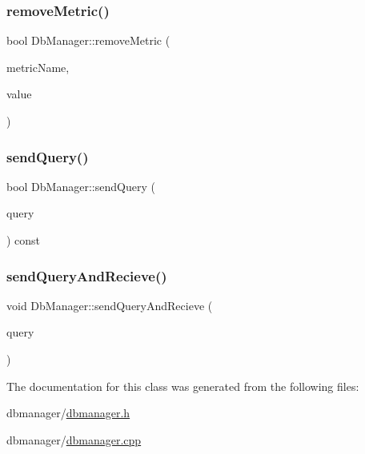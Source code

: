 \subsubsection{\texorpdfstring{remove\+Metric()}{removeMetric()}}
{\footnotesize\ttfamily bool Db\+Manager\+::remove\+Metric (\begin{DoxyParamCaption}\item[{const Q\+String \&}]{metric\+Name,  }\item[{Q\+String}]{value }\end{DoxyParamCaption})}

\mbox{\label{class_db_manager_a9dc0b40635f274bfda0470ac6b8fdf8e}} 
\subsubsection{\texorpdfstring{send\+Query()}{sendQuery()}}
{\footnotesize\ttfamily bool Db\+Manager\+::send\+Query (\begin{DoxyParamCaption}\item[{Q\+String}]{query }\end{DoxyParamCaption}) const}

\mbox{\label{class_db_manager_ac31abceb0dd13bd030fc293f5f88797a}} 
\subsubsection{\texorpdfstring{send\+Query\+And\+Recieve()}{sendQueryAndRecieve()}}
{\footnotesize\ttfamily void Db\+Manager\+::send\+Query\+And\+Recieve (\begin{DoxyParamCaption}\item[{Q\+String}]{query }\end{DoxyParamCaption})}



The documentation for this class was generated from the following files\+:\begin{DoxyCompactItemize}
\item 
dbmanager/\hyperlink{dbmanager_8h}{dbmanager.\+h}\item 
dbmanager/\hyperlink{dbmanager_8cpp}{dbmanager.\+cpp}\end{DoxyCompactItemize}
